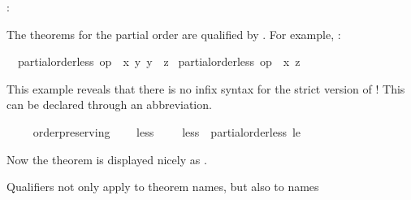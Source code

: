\begin{isabellebody}
\begin{isamarkuptext}
  : %
\end{isamarkuptext}%
\isamarkuptrue%
%
\begin{isamarkuptext}%
The theorems for the partial order \isa{{\isasympreceq}}
  are qualified by .  For example, : \begin{isabelle}%
\ \ {\isasymlbrakk}partial{\isacharunderscore}order{\isachardot}less\ op\ {\isasympreceq}\ {\isacharquery}x\ {\isacharquery}y{\isacharsemicolon}\ {\isacharquery}y\ {\isasympreceq}\ {\isacharquery}z{\isasymrbrakk}\isanewline
\isaindent{\ \ }{\isasymLongrightarrow}\ partial{\isacharunderscore}order{\isachardot}less\ op\ {\isasympreceq}\ {\isacharquery}x\ {\isacharquery}z%
\end{isabelle}%
\end{isamarkuptext}%
\isamarkuptrue%
%
\isadeliminvisible
%
\endisadeliminvisible
%
\isataginvisible
{}\isamarkupfalse%
%
\endisataginvisible
{\isafoldinvisible}%
%
\isadeliminvisible
%
\endisadeliminvisible
%
\begin{isamarkuptext}%
This example reveals that there is no infix syntax for the strict
  version of \isa{{\isasympreceq}}!  This can be declared through an abbreviation.%
\end{isamarkuptext}%
\isamarkuptrue%
\ \ \isamarkupfalse%
\ {\isacharparenleft}\ order{\isacharunderscore}preserving{\isacharparenright}\isanewline
\ \ \ \ less{\isacharprime}\ {\isacharparenleft}\ {\isachardoublequoteopen}{\isasymprec}{\isachardoublequoteclose}\ {}{}{\isacharparenright}\ \ {\isachardoublequoteopen}less{\isacharprime}\ {\isasymequiv}\ partial{\isacharunderscore}order{\isachardot}less\ le{\isacharprime}{\isachardoublequoteclose}%
\begin{isamarkuptext}%
Now the theorem is displayed nicely as
  .%
\end{isamarkuptext}%
\isamarkuptrue%
%
\begin{isamarkuptext}%
Qualifiers not only apply to theorem names, but also to names

\end{isamarkuptext}
\end{isabellebody}
